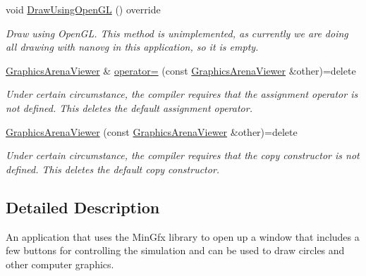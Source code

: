 \begin{DoxyCompactItemize}
\mbox{\label{class_graphics_arena_viewer_af894508bfa039199c6ff7f1b5a7da158}} 
void \mbox{\hyperlink{class_graphics_arena_viewer_af894508bfa039199c6ff7f1b5a7da158}{Draw\+Using\+Open\+GL}} () override
\begin{DoxyCompactList}\small\item\em Draw using {\ttfamily Open\+GL}. This method is unimplemented, as currently we are doing all drawing with {\ttfamily nanovg} in this application, so it is empty. \end{DoxyCompactList}\item 
\mbox{\label{class_graphics_arena_viewer_a289278f7b338fc60f983827d21b159ff}} 
\mbox{\hyperlink{class_graphics_arena_viewer}{Graphics\+Arena\+Viewer}} \& \mbox{\hyperlink{class_graphics_arena_viewer_a289278f7b338fc60f983827d21b159ff}{operator=}} (const \mbox{\hyperlink{class_graphics_arena_viewer}{Graphics\+Arena\+Viewer}} \&other)=delete
\begin{DoxyCompactList}\small\item\em Under certain circumstance, the compiler requires that the assignment operator is not defined. This {\ttfamily deletes} the default assignment operator. \end{DoxyCompactList}\item 
\mbox{\label{class_graphics_arena_viewer_afa70b72e0769db0f3f41fe37bc540621}} 
\mbox{\hyperlink{class_graphics_arena_viewer_afa70b72e0769db0f3f41fe37bc540621}{Graphics\+Arena\+Viewer}} (const \mbox{\hyperlink{class_graphics_arena_viewer}{Graphics\+Arena\+Viewer}} \&other)=delete
\begin{DoxyCompactList}\small\item\em Under certain circumstance, the compiler requires that the copy constructor is not defined. This {\ttfamily deletes} the default copy constructor. \end{DoxyCompactList}\end{DoxyCompactItemize}


\subsection{Detailed Description}
An application that uses the Min\+Gfx library to open up a window that includes a few buttons for controlling the simulation and can be used to draw circles and other computer graphics. 

